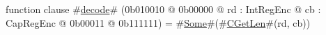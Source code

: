 function clause #\hyperref[zdecode]{decode}# (0b010010 @ 0b00000 @ rd : IntRegEnc @ cb : CapRegEnc @    0b00011 @ 0b111111) = #\hyperref[zSome]{Some}#(#\hyperref[zCGetLen]{CGetLen}#(rd, cb))
